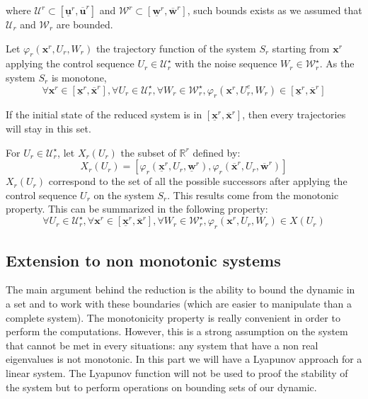 where $\mathcal{U}^r \subset \left [\underline{\mathbf{u}}^r, \overline{\mathbf{u}}^r \right ]$ and $\mathcal{W}^r \subset \left [\underline{\mathbf{w}}^r, \overline{\mathbf{w}}^r \right ]$, such bounds exists as we assumed that $\mathcal{U}_r$ and $\mathcal{W}_r$ are bounded.

Let $\varphi_r (\mathbf{x}^r,U_r,W_r)$ the trajectory function of the system $S_r$ starting from $\mathbf{x}^r$
applying the control sequence $U_r \in \mathcal{U}_r^\star$
with the noise sequence $W_r \in \mathcal{W}_r^\star$.
As the system $S_r$ is monotone,
$$
\forall \mathbf{x}^r \in \left [\underline{\mathbf{x}}^r, \overline{\mathbf{x}}^r \right ],
\forall U_r \in \mathcal{U}_r^\star,
\forall W_r \in \mathcal{W}_r^\star,
\varphi_r(\mathbf{x}^r,U_r^e,W_r)
\in \left [\underline{\mathbf{x}}^r, \overline{\mathbf{x}}^r \right ]$$

If the initial state of the reduced system is in $\left [\underline{\mathbf{x}}^r, \overline{\mathbf{x}}^r \right ]$, then every trajectories will stay in this set.

For $U_r \in \mathcal{U}_r^\star$, let $X_r(U_r)$ the subset of $\mathbb{R}^r$ defined by:
\begin{equation}
X_r(U_r) = \left [ 
\varphi_r(\underline{\mathbf{x}}^r,U_r,\underline{\mathbf{w}}^r),
\varphi_r(\overline{\mathbf{x}}^r,U_r,\overline{\mathbf{w}}^r)
\right ]
\end{equation}
$X_r(U_r)$ correspond to the set of all the possible successors after applying the control sequence $U_r$ on the system $S_r$. This results come from the monotonic property.
This can be summarized in the following property:
$$
\forall U_r \in \mathcal{U}_r^\star,
\forall \mathbf{x}^r \in \left [\underline{\mathbf{x}}^r, \overline{\mathbf{x}}^r \right ],
\forall W_r \in \mathcal{W}_r^\star,
\varphi_r(\mathbf{x}^r,U_r,W_r)
\in X(U_r)$$

\subsection{Extension to non monotonic systems}
The main argument behind the reduction is the ability to bound the dynamic in a set and to work with these boundaries (which are easier to manipulate than a complete system).
The monotonicity property is really convenient in order to perform the computations.
However, this is a strong assumption on the system that cannot be met in every situations: any system that have a non real eigenvalues is not monotonic.
In this part we will have a Lyapunov approach for a linear system.
The Lyapunov function will not be used to proof the stability of the system but to perform operations on bounding sets of our dynamic.

